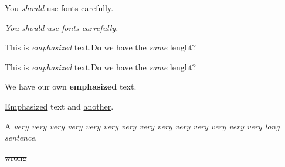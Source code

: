 \documentclass{article}
\begin{document}
	
	You \emph{should} use fonts carefully.
	
	\textit{You \emph{should} use fonts carrefully. }
	
	This is {\em emphasized\/} text.Do we have the {\em same\/} lenght?
	
	This is {\em emphasized} text.Do we have the {\em same} lenght?
	
	\newcommand{\Emph}{\textbf}
	We have our own \Emph{emphasized} text.
	
	\uline{Emphasized} text and \uline{another}.
	
	A \emph{very very very very very very very very very very very very very very   long sentence}.
	
	\qquad{}\qquad\sout{wrong}\qquad{}\qquad{}\qquad{}
	
\end{document}
